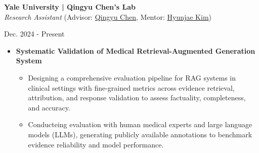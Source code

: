 \documentclass[10pt, letterpaper]{article}
\newenvironment{highlights}{
    \begin{itemize}[
        topsep=0.10 cm,
        parsep=0.10 cm,
        partopsep=0pt,
        itemsep=0pt,
        leftmargin=0 cm + 10pt
    ]
}{
    \end{itemize}
} %
\newenvironment{twocolentry}[2][]{
    \onecolentry
    \def\secondColumn{#2}
    \setcolumnwidth{\fill, 3.5 cm}
    \begin{paracol}{2}
}{
    \switchcolumn \raggedleft \secondColumn
    \end{paracol}
    \endonecolentry
} %
\begin{document}
\vspace{0.2 cm}
        \begin{twocolentry}{
            Dec. 2024 - Present\\ 
        }
        \textbf{Yale University | Qingyu Chen's Lab} \href{https://sites.google.com/view/qingyuchen/home/}{\faExternalLink*}\\
        \textit{Research Assistant} (Advisor: \href{https://scholar.google.com/citations?user=FSLotiMAAAAJ&hl=en}{Qingyu Chen}, Mentor: \href{https://scholar.google.co.kr/citations?user=rqBpumIAAAAJ&hl=ko}{Hyunjae Kim})
        
        \end{twocolentry}
    \vspace{0.2 cm}
\begin{highlights}
    \item \textbf{Systematic Validation of Medical Retrieval-Augmented Generation System}
    \vspace{-0.1 cm}
    \begin{highlights}
        \item Designing a comprehensive evaluation pipeline for RAG systems in clinical settings with fine-grained metrics across evidence retrieval, attribution, and response validation to assess factuality, completeness, and accuracy.
        \item Conducteing evaluation with human medical experts and  large language models (LLMs), generating publicly available annotations to benchmark evidence reliability and model performance.
    \end{highlights}

\end{highlights}
\end{document}
